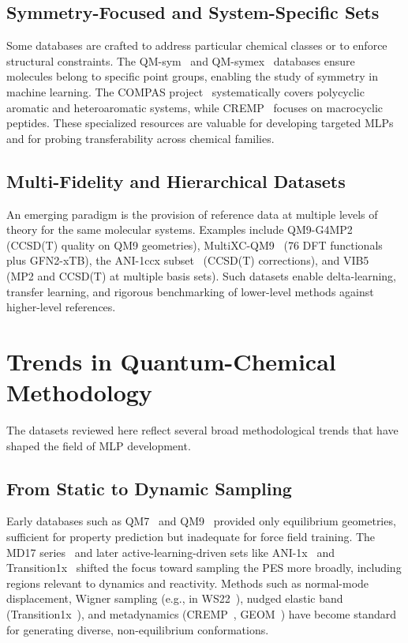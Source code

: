 \documentclass[12pt]{article}
\begin{document}
\subsection*{Symmetry-Focused and System-Specific Sets}
Some databases are crafted to address particular chemical classes or to enforce structural constraints. The QM-sym~\cite{ds29-38} and QM-symex~\cite{ds30-39} databases ensure molecules belong to specific point groups, enabling the study of symmetry in machine learning. The COMPAS project~\cite{ds32-12,ds32-13,ds32-14} systematically covers polycyclic aromatic and heteroaromatic systems, while CREMP~\cite{ds33-15} focuses on macrocyclic peptides. These specialized resources are valuable for developing targeted MLPs and for probing transferability across chemical families.

\subsection*{Multi-Fidelity and Hierarchical Datasets}
An emerging paradigm is the provision of reference data at multiple levels of theory for the same molecular systems. Examples include QM9-G4MP2~\cite{ds2-36} (CCSD(T) quality on QM9 geometries), MultiXC-QM9~\cite{ds3-22} (76 DFT functionals plus GFN2-xTB), the ANI-1ccx subset~\cite{ds26-3} (CCSD(T) corrections), and VIB5~\cite{ds24-48} (MP2 and CCSD(T) at multiple basis sets). Such datasets enable delta-learning, transfer learning, and rigorous benchmarking of lower-level methods against higher-level references.

\section{Trends in Quantum-Chemical Methodology}

The datasets reviewed here reflect several broad methodological trends that have shaped the field of MLP development.

\subsection*{From Static to Dynamic Sampling}
Early databases such as QM7~\cite{ds7-32} and QM9~\cite{ds1-1} provided only equilibrium geometries, sufficient for property prediction but inadequate for force field training. The MD17 series~\cite{ds20-18} and later active-learning-driven sets like ANI-1x~\cite{ds26-3} and Transition1x~\cite{ds28-47} shifted the focus toward sampling the PES more broadly, including regions relevant to dynamics and reactivity. Methods such as normal-mode displacement, Wigner sampling (e.g., in WS22~\cite{ds23-50}), nudged elastic band (Transition1x~\cite{ds28-47}), and metadynamics (CREMP~\cite{ds33-15}, GEOM~\cite{ds34-16}) have become standard for generating diverse, non-equilibrium conformations.
\end{document}
